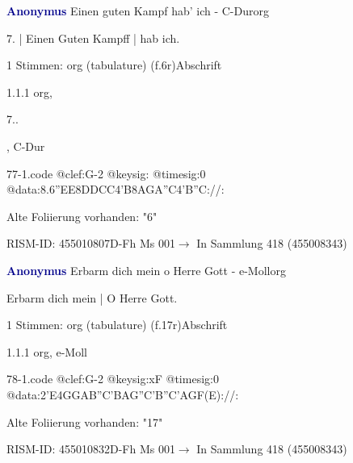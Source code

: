 \documentclass[twocolumn, 12pt]{book}
\begin{document}
\par \vspace{16pt} \textcolor{darkblue}{\textbf{Anonymus  }}\hfillplus{\textbf{[77]}}\newline Einen guten Kampf hab' ich - C-Dur\newline org
\par \begin{itshape}[f.6r, at left:] 7. | Einen Guten Kampff | hab ich.\end{itshape} 
\par \textcolor{darkblue}{}  1 Stimmen: org (tabulature)  (f.6r)\newline Abschrift
\par 1.1.1  org, \begin{itshape}7..\end{itshape}, C-Dur  
\begin{filecontents*}{77-1.code}
@clef:G-2
@keysig:
@timesig:0
@data:8.6''EE{8DD}{CC}4'B{8AGA''C}4'B''C://:
\end{filecontents*}
\newline %
\par Alte Foliierung vorhanden: "6"
\par RISM-ID: 455010807\newline D-Fh  Ms 001\newline $\rightarrow$ In Sammlung 418 (455008343)
      
\par \vspace{16pt} \textcolor{darkblue}{\textbf{Anonymus  }}\hfillplus{\textbf{[78]}}\newline Erbarm dich mein o Herre Gott - e-Moll\newline org
\par \begin{itshape}[f.17r, at left:] Erbarm dich mein | O Herre Gott.\end{itshape} 
\par \textcolor{darkblue}{}  1 Stimmen: org (tabulature)  (f.17r)\newline Abschrift
\par 1.1.1  org, e-Moll  
\begin{filecontents*}{78-1.code}
@clef:G-2
@keysig:xF
@timesig:0
@data:2'E4GGAB''C'BAG''C'B''C'AGF(E)://:
\end{filecontents*}
\newline %
\par Alte Foliierung vorhanden: "17"
\par RISM-ID: 455010832\newline D-Fh  Ms 001\newline $\rightarrow$ In Sammlung 418 (455008343)
      
\end{document}
